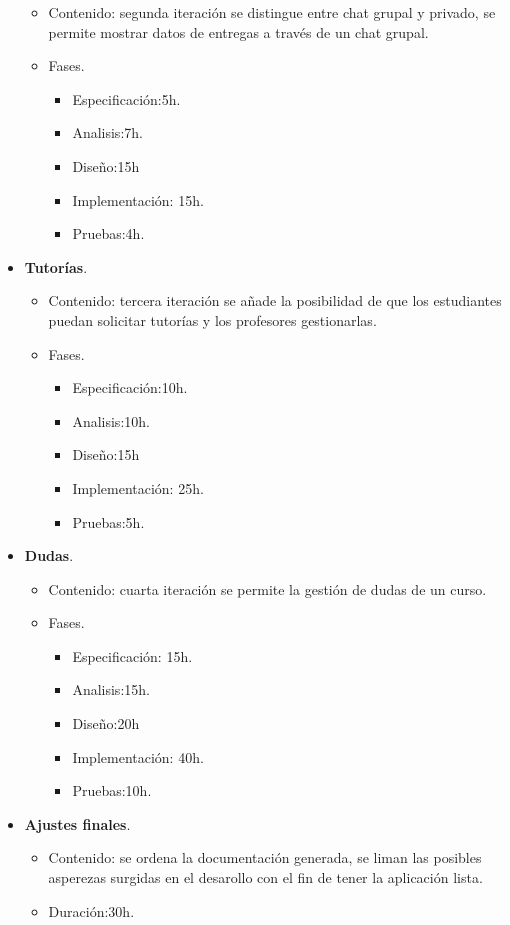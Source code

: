 \begin{itemize}
\begin{itemize}
\item Contenido: segunda iteración se distingue entre chat grupal y privado, se permite mostrar datos de entregas a través de un chat grupal.
\item Fases.
\begin{itemize}
\item Especificación:5h.
\item Analisis:7h.
\item Diseño:15h
\item Implementación: 15h.
\item Pruebas:4h.
\end{itemize}
\end{itemize}
\item \textbf{Tutorías}. 
\begin{itemize}
\item Contenido: tercera iteración se añade la posibilidad de que los estudiantes puedan solicitar tutorías y los profesores gestionarlas.
\item Fases.
\begin{itemize}
\item Especificación:10h.
\item Analisis:10h.
\item Diseño:15h
\item Implementación: 25h.
\item Pruebas:5h.
\end{itemize}
\end{itemize}
\item \textbf{Dudas}. 
\begin{itemize}
\item Contenido: cuarta iteración se permite la gestión de dudas de un curso.
\item Fases.
\begin{itemize}
\item Especificación: 15h.
\item Analisis:15h.
\item Diseño:20h
\item Implementación: 40h.
\item Pruebas:10h.
\end{itemize}
\end{itemize}
\item \textbf{Ajustes finales}.
\begin{itemize}
\item Contenido: se ordena la documentación generada, se liman las posibles asperezas surgidas en el desarollo con el fin de tener la aplicación lista.
\item Duración:30h.
\end{itemize}
\end{itemize} 
 
